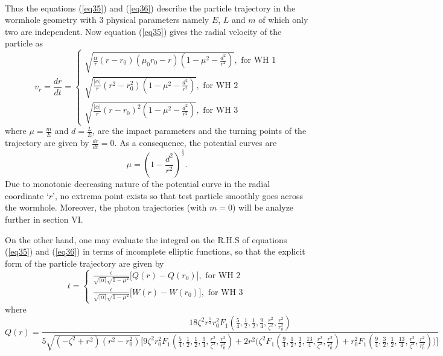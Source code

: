 \documentclass[10pt]{revtex4}
\begin{document}
\\
Thus the equations (\ref{eq35}) and (\ref{eq36}) describe the particle trajectory in the wormhole geometry with 3 physical parameters namely $E$, $L$ and $m$ of which only two are independent. Now equation (\ref{eq35}) gives the radial velocity of the particle as
\begin{equation}\label{eq38}
v_r=\frac{dr}{dt}=
\begin{cases}
\sqrt{\frac{\alpha}{r}(r-r_0)(\mu_0 r_0-r)\left(1-\mu^2-\frac{d^2}{r^2}\right)},\text{ for WH 1}\\
\sqrt{\frac{|\alpha|}{r}(r^2-r_0^2)\left(1-\mu^2-\frac{d^2}{r^2}\right)},\text{ for WH 2}\\
\sqrt{\frac{|\alpha|}{r}(r-r_0)^2\left(1-\mu^2-\frac{d^2}{r^2}\right)},\text{ for WH 3}

\end{cases}
\end{equation}
where $\mu=\frac{m}{E}$ and $d=\frac{L}{E}$, are the impact parameters and the turning points of the trajectory are given by $\frac{dr}{dt}=0$. As a consequence, the potential curves are
\begin{equation}
\mu=\left(1-\frac{d^2}{r^2}\right)^{\frac{1}{2}}.
\end{equation} 
Due to monotonic decreasing nature of the potential curve in the radial coordinate `$r$', no extrema point exists so that test particle smoothly goes across the wormhole. Moreover, the photon trajectories (with $m=0$) will be analyze further in section VI.
\par 
 On the other hand, one may evaluate the integral on the R.H.S of equations (\ref{eq35}) and (\ref{eq36}) in terms of incomplete elliptic functions, so that the explicit form of the particle trajectory are given by 
 \begin{equation}
 t=
 \begin{cases}
 \frac{\epsilon}{\sqrt{|\alpha|}\sqrt{1-\mu^2}}\big[Q(r)-Q(r_0)\big], \text{ for WH 2}\\
 \frac{\epsilon}{\sqrt{|\alpha|}\sqrt{1-\mu^2}}\big[W(r)-W(r_0)\big], \text{ for WH 3}
 \end{cases}
 \end{equation}
 where 
 \begin{equation*}
 Q(r)=\frac{18\zeta^2r^{\frac{5}{2}}r_0^2F_1(\frac{5}{4}, \frac{1}{2}, \frac{1}{2}, \frac{9}{4},\frac{r^2}{\zeta^2}, \frac{r^2}{r_0^2})}{5\sqrt{(-\zeta^2+r^2)(r^2-r_0^2)}\biggl[9\zeta^2r_0^2F_1(\frac{5}{4}, \frac{1}{2}, \frac{1}{2}, \frac{9}{4},\frac{r^2}{\zeta^2}, \frac{r^2}{r_0^2})+2r^2\bigg(\zeta^2F_1(\frac{9}{4}, \frac{1}{2}, \frac{3}{2}, \frac{13}{4},\frac{r^2}{\zeta^2}, \frac{r^2}{r_0^2})+r_0^2F_1(\frac{9}{4}, \frac{3}{2}, \frac{1}{2}, \frac{13}{4},\frac{r^2}{\zeta^2}, \frac{r^2}{r_0^2}) \bigg)\biggr]}
 \end{equation*}
\end{document}
